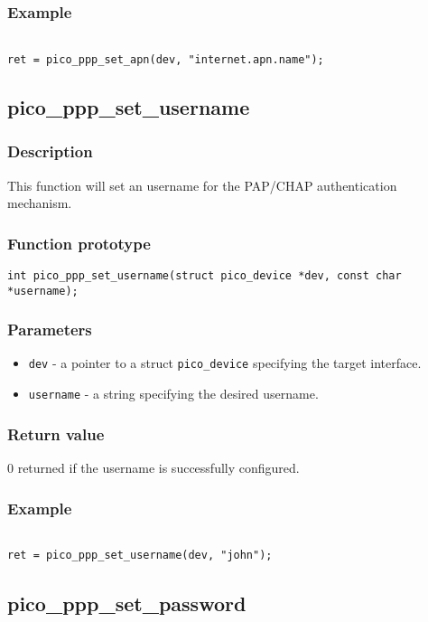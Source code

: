 \subsubsection*{Example}
\begin{verbatim}

ret = pico_ppp_set_apn(dev, "internet.apn.name");

\end{verbatim}
\subsection{pico\_ppp\_set\_username}
\subsubsection*{Description}
This function will set an username for the PAP/CHAP authentication mechanism.  

\subsubsection*{Function prototype}
\texttt{int pico\_ppp\_set\_username(struct pico\_device *dev, const char *username); }

\subsubsection*{Parameters}
\begin{itemize}[noitemsep]
\item \texttt{dev} - a pointer to a struct \texttt{pico\_device} specifying the target interface.
\item \texttt{username} - a string specifying the desired username.
\end{itemize}

\subsubsection*{Return value}
0 returned if the username is successfully configured.

\subsubsection*{Example}
\begin{verbatim}

ret = pico_ppp_set_username(dev, "john");

\end{verbatim}
\subsection{pico\_ppp\_set\_password}
